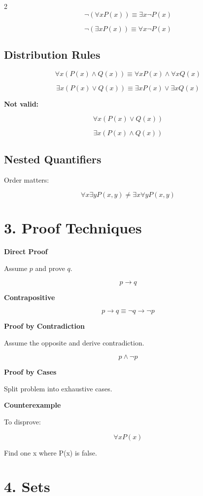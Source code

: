 \documentclass[10pt]{article}
\begin{document}
\begin{multicols}{2}
\[
\neg(\forall x P(x)) \equiv \exists x \neg P(x)
\]

\[
\neg(\exists x P(x)) \equiv \forall x \neg P(x)
\]

\subsection*{Distribution Rules}

\[
\forall x (P(x) \land Q(x)) \equiv \forall x P(x) \land \forall x Q(x)
\]

\[
\exists x (P(x) \lor Q(x)) \equiv \exists x P(x) \lor \exists x Q(x)
\]

\textbf{Not valid:}

\[
\forall x (P(x) \lor Q(x))
\]

\[
\exists x (P(x) \land Q(x))
\]

\subsection*{Nested Quantifiers}

Order matters:

\[
\forall x \exists y P(x,y) \neq \exists x \forall y P(x,y)
\]

\section*{3. Proof Techniques}

\textbf{Direct Proof}

Assume $p$ and prove $q$.

\[
p \rightarrow q
\]

\textbf{Contrapositive}

\[
p \rightarrow q \equiv \neg q \rightarrow \neg p
\]

\textbf{Proof by Contradiction}

Assume the opposite and derive contradiction.

\[
p \land \neg p
\]

\textbf{Proof by Cases}

Split problem into exhaustive cases.

\textbf{Counterexample}

To disprove:

\[
\forall x P(x)
\]

Find one x where P(x) is false.

\section*{4. Sets}


\end{multicols}
\end{document}
